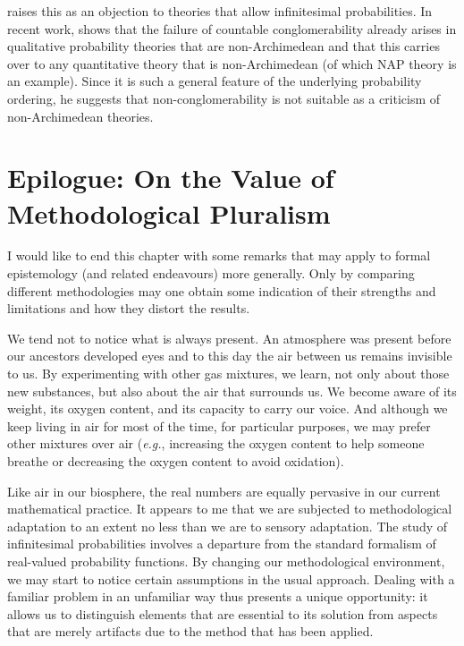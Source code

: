 \citet{Pruss:2012,Pruss:2014} raises this as an objection to theories that allow infinitesimal probabilities. In recent work, \citet[p.~1200]{DiBella:2018} shows that the failure of countable conglomerability already arises in qualitative probability theories that are non-Archimedean and that this carries over to any quantitative theory that is non-Archimedean (of which NAP theory is an example). Since it is such a general feature of the underlying probability ordering, he suggests that non-conglomerability is not suitable as a criticism of non-Archimedean theories.

\section[Epilogue]{Epilogue: On the Value of Methodological Pluralism}
I would like to end this chapter with some remarks that may apply to formal epistemology (and related endeavours) more generally. Only by comparing different methodologies may one obtain some indication of their strengths and limitations and how they distort the results.

We tend not to notice what is always present. An atmosphere was present before our ancestors developed eyes and to this day the air between us remains invisible to us. By experimenting with other gas mixtures, we learn, not only about those new substances, but also about the air that surrounds us. We become aware of its weight, its oxygen content, and its capacity to carry our voice.
And although we keep living in air for most of the time, for particular purposes, we may prefer other mixtures over air (\textit{e.g.}, increasing the oxygen content to help someone breathe or decreasing the oxygen content to avoid oxidation).

Like air in our biosphere, the real numbers are equally pervasive in our current mathematical practice. It appears to me that we are subjected to methodological adaptation to an extent no less than we are to sensory adaptation. The study of infinitesimal probabilities involves a departure from the standard formalism of real-valued probability functions. By changing our methodological environment, we may start to notice certain assumptions in the usual approach. Dealing with a familiar problem in an unfamiliar way thus presents a unique opportunity: it allows us to distinguish elements that are essential to its solution from aspects that are merely artifacts due to the method that has been applied.

